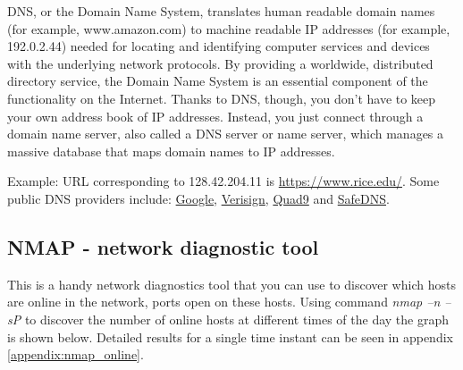 \documentclass[a4paper, 11pt]{article}
\begin{document}
DNS, or the Domain Name System, translates human readable domain names (for example, www.amazon.com) to machine readable IP addresses (for example, 192.0.2.44) needed for locating and identifying computer services and devices with the underlying network protocols. By providing a worldwide, distributed directory service, the Domain Name System is an essential component of the functionality on the Internet. Thanks to DNS, though, you don't have to keep your own address book of IP addresses. Instead, you just connect through a domain name server, also called a DNS server or name server, which manages a massive database that maps domain names to IP addresses.

Example: URL corresponding to 128.42.204.11 is \url{https://www.rice.edu/}. Some public DNS providers include: \href{https://developers.google.com/speed/public-dns/}{Google}, \href{https://www.verisign.com/en_US/security-services/public-dns/index.xhtml}{Verisign}, \href{https://www.quad9.net/}{Quad9} and \href{https://www.safedns.com/en/features/}{SafeDNS}. 

\subsection{NMAP - network diagnostic tool}

This is a handy network diagnostics tool that you can use to discover which hosts are online in the network, ports open on these hosts. Using command \textit{nmap –n –sP} to discover the number of online hosts at different times of the day the graph is shown below. Detailed results for a single time instant can be seen in appendix \ref{appendix:nmap_online}.

\begin{center}
\end{center}
\end{document}
